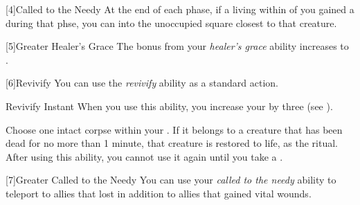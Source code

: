         [4]{Called to the Needy} At the end of each phase, if a living  within \distrange of you gained a  during that phse, you can  into the unoccupied square closest to that creature.

        [5]{Greater Healer's Grace} The bonus from your \textit{healer's grace} ability increases to .

        [6]{Revivify} You can use the \textit{revivify} ability as a standard action.
        \begin{instantability}{Revivify}
            Instant
            \rankline
            When you use this ability, you increase your  by three (see ).

            Choose one intact corpse within your .
            If it belongs to a creature that has been dead for no more than 1 minute, that creature is restored to life, as the  ritual.
            After using this ability, you cannot use it again until you take a .
        \end{instantability}

        [7]{Greater Called to the Needy} You can use your \textit{called to the needy} ability to teleport to allies that lost  in addition to allies that gained vital wounds.

